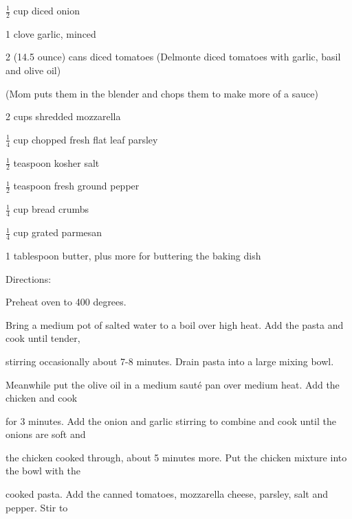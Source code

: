 \documentclass[a4paper,portrait,12pt]{book}
\begin{document}
$\frac{1}{2}$ cup diced onion




1 clove garlic, minced




2 (14.5 ounce) cans diced tomatoes (Delmonte diced tomatoes with garlic, basil and olive oil)




(Mom puts them in the blender and chops them to make more of a sauce)




2 cups shredded mozzarella




$\frac{1}{4}$ cup chopped fresh flat leaf parsley




$\frac{1}{2}$ teaspoon kosher salt




$\frac{1}{2}$ teaspoon fresh ground pepper




$\frac{1}{4}$ cup bread crumbs




$\frac{1}{4}$ cup grated parmesan




1 tablespoon butter, plus more for buttering the baking dish




Directions:




Preheat oven to 400 degrees.




Bring a medium pot of salted water to a boil over high heat. Add the pasta and cook until tender,




stirring occasionally about 7-8 minutes. Drain pasta into a large mixing bowl.




Meanwhile put the olive oil in a medium saut\'{e} pan over medium heat. Add the chicken and cook




for 3 minutes. Add the onion and garlic stirring to combine and cook until the onions are soft and




the chicken cooked through, about 5 minutes more. Put the chicken mixture into the bowl with the




cooked pasta. Add the canned tomatoes, mozzarella cheese, parsley, salt and pepper. Stir to
\end{document}
